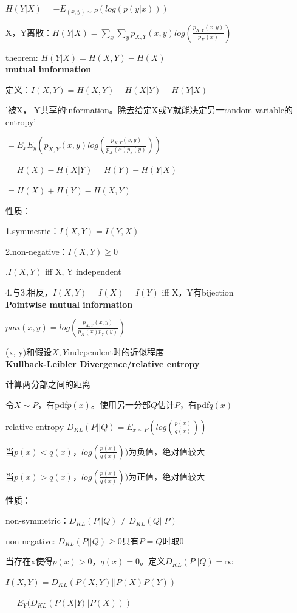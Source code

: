 \documentclass[UTF8]{ctexart}
\begin{document}
  $H(Y | X) = -E_{(x, y) \sim P}(log(p(y | x)))$

  X，Y离散：$H(Y | X) = \sum_x\sum_yp_{X, Y}(x, y)log(\frac{p_{X, Y}(x, y)}{p_X(x)})$

  theorem: $H(Y | X) = H(X, Y) - H(X)$\\
\textbf{mutual imformation}

  定义：$I(X, Y) = H(X, Y) - H(X | Y) - H(Y | X)$

  \quad '被X， Y共享的information。除去给定X或Y就能决定另一random variable的entropy'

  \quad $ = E_xE_y(p_{X, Y}(x, y)log(\frac{p_{X, Y}(x, y)}{p_X(x)p_Y(y)}))$

  \quad $ = H(X) - H(X | Y) = H(Y) - H(Y | X)$

  \quad $ = H(X) + H(Y) - H(X, Y)$

  性质：

  \quad 1.symmetric：$I(X, Y) = I(Y, X)$

  \quad 2.non-negative：$I(X, Y) \geq 0$

  .$I(X, Y)$ iff X, Y independent

  \quad 4.与3.相反，$I(X, Y) = I(X) = I(Y)$ iff X，Y有bijection\\
\textbf{Pointwise mutual information}

  $pmi(x, y) = log(\frac{p_{X, Y}(x, y)}{p_X(x)p_Y(y)})$

  (x, y)和假设$X, Y$independent时的近似程度\\
\textbf{Kullback-Leibler Divergence/relative entropy}

  计算两分部之间的距离

  令$X \sim P$，有pdf$p(x)$。使用另一分部$Q$估计$P$，有pdf$q(x)$

  relative entropy $D_{KL}(P || Q) = E_{x \sim P}(log(\frac{p(x)}{q(x)}))$

  \quad 当$p(x) < q(x)$，$log(\frac{p(x)}{q(x)}))$为负值，绝对值较大
  
  \quad 当$p(x) > q(x)$，$log(\frac{p(x)}{q(x)}))$为正值，绝对值较大

  性质：

  \quad non-symmetric：$D_{KL}(P||Q) \neq D_{KL}(Q || P)$

  \quad non-negative: $D_{KL}(P||Q) \geq 0$只有$P = Q$时取0

  \quad 当存在x使得$p(x) > 0$，$q(x) = 0$。定义$D_{KL}(P||Q) = \infty$

  \quad $I(X, Y) = D_{KL}(P(X, Y) || P(X)P(Y))$

  \quad \quad $ = E_Y(D_{KL}(P(X | Y) || P(X)))$
\end{document}
